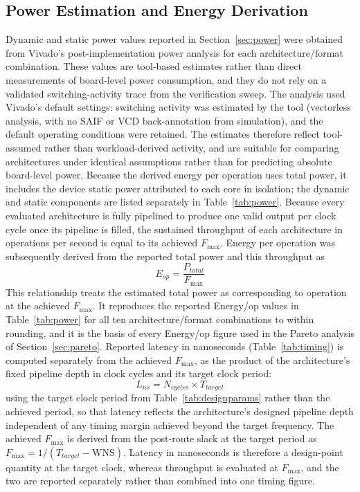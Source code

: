 \documentclass[manuscript,screen,review]{acmart}
\begin{document}
\subsection{Power Estimation and Energy Derivation}

Dynamic and static power values reported in Section~\ref{sec:power} were obtained from Vivado's post-implementation power analysis for each architecture/format combination. These values are tool-based estimates rather than direct measurements of board-level power consumption, and they do not rely on a validated switching-activity trace from the verification sweep. The analysis used Vivado's default settings: switching activity was estimated by the tool (vectorless analysis, with no SAIF or VCD back-annotation from simulation), and the default operating conditions were retained. The estimates therefore reflect tool-assumed rather than workload-derived activity, and are suitable for comparing architectures under identical assumptions rather than for predicting absolute board-level power. Because the derived energy per operation uses total power, it includes the device static power attributed to each core in isolation; the dynamic and static components are listed separately in Table~\ref{tab:power}. Because every evaluated architecture is fully pipelined to produce one valid output per clock cycle once its pipeline is filled, the sustained throughput of each architecture in operations per second is equal to its achieved $F_{\max}$. Energy per operation was subsequently derived from the reported total power and this throughput as
\begin{equation}
E_{op} = \frac{P_{total}}{F_{\max}}
\label{eq:energyop}
\end{equation}
This relationship treats the estimated total power as corresponding to operation at the achieved $F_{\max}$. It reproduces the reported Energy/op values in Table~\ref{tab:power} for all ten architecture/format combinations to within rounding, and it is the basis of every Energy/op figure used in the Pareto analysis of Section~\ref{sec:pareto}. Reported latency in nanoseconds (Table~\ref{tab:timing}) is computed separately from the achieved $F_{\max}$, as the product of the architecture's fixed pipeline depth in clock cycles and its target clock period:
\begin{equation}
L_{ns} = N_{cycles} \times T_{target}
\label{eq:latency}
\end{equation}
using the target clock period from Table~\ref{tab:designparams} rather than the achieved period, so that latency reflects the architecture's designed pipeline depth independent of any timing margin achieved beyond the target frequency. The achieved $F_{\max}$ is derived from the post-route slack at the target period as $F_{\max} = 1/(T_{target} - \mathrm{WNS})$. Latency in nanoseconds is therefore a design-point quantity at the target clock, whereas throughput is evaluated at $F_{\max}$, and the two are reported separately rather than combined into one timing figure.
\end{document}
